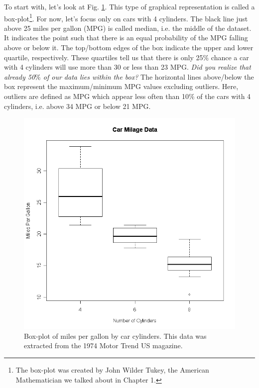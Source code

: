 \documentclass[10pt]{PhDthesisPSnPDF}%
\begin{document}
To start with, let's look at Fig. \ref{fig:boxplot}. This type of graphical representation is called a box-plot\footnote{The box-plot was created by John Wilder Tukey, the American Mathematician we talked about in Chapter 1.}. For now, let's focus only on cars with 4 cylinders. The black line just above 25 miles per gallon (MPG) is called median, i.e. the middle of the dataset. It indicates the point such that there is an equal probability of the MPG falling above or below it. The top/bottom edges of the box indicate the upper and lower quartile, respectively. These quartiles tell us that there is only 25$\%$ chance a car with 4 cylinders will use more than 30 or less than 23 MPG. \textit{Did you realize that already 50$\%$ of our data lies within the box?} The horizontal lines above/below the box represent the maximum/minimum MPG values excluding outliers. Here, outliers are defined as MPG which appear less often than 10$\%$ of the cars with 4 cylinders, i.e. above 34 MPG or below 21 MPG.

\begin{figure}[h]
	\begin{center}
			\includegraphics[scale=0.25]{milleagech2}
	\end{center}
	\caption{Box-plot of miles per gallon by car cylinders. This data was extracted from the 1974 Motor Trend US magazine.}
	\label{fig:boxplot}
\end{figure} 
\end{document}
